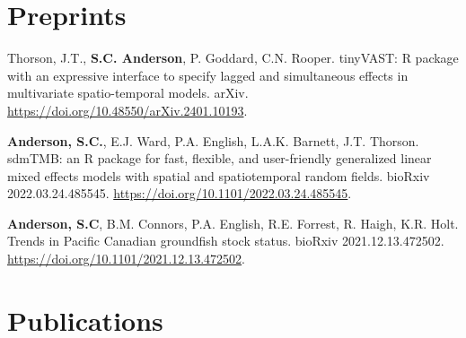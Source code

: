 \section{Preprints}\label{preprints}

\begin{description}
\tightlist
\item[2024]
Thorson, J.T., \textbf{S.C. Anderson}, P. Goddard, C.N. Rooper.
tinyVAST: R package with an expressive interface to specify lagged and
simultaneous effects in multivariate spatio-temporal models. arXiv.
\url{https://doi.org/10.48550/arXiv.2401.10193}.
\item[2024]
\textbf{Anderson, S.C.}, E.J. Ward, P.A. English, L.A.K. Barnett, J.T.
Thorson. sdmTMB: an R package for fast, flexible, and user-friendly
generalized linear mixed effects models with spatial and spatiotemporal
random fields. bioRxiv 2022.03.24.485545.
\url{https://doi.org/10.1101/2022.03.24.485545}.
\item[2021]
\textbf{Anderson, S.C}, B.M. Connors, P.A. English, R.E. Forrest, R.
Haigh, K.R. Holt. Trends in Pacific Canadian groundfish stock status.
bioRxiv 2021.12.13.472502.
\url{https://doi.org/10.1101/2021.12.13.472502}.
\end{description}

\section{Publications}\label{publications}

